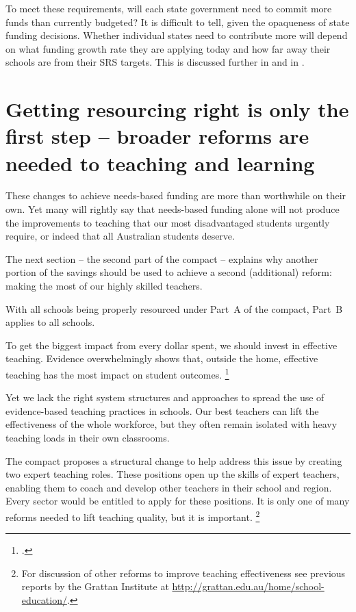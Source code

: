 \documentclass{grattan}
\begin{document}
To meet these requirements, will each state government need to commit more funds than currently budgeted?
It is difficult to tell, given the opaqueness of state funding decisions.
Whether individual states need to contribute more will depend on what funding growth rate they are applying today and how far away their schools are from their SRS targets.
This is discussed further in  and in .

\section{Getting resourcing right is only the first step -- broader reforms are needed to teaching and learning}\label{sec:getting-resourcing-right-is-only-the-first-step-broader-reforms-are-needed-to-teaching-and-learning}

These changes to achieve needs-based funding are more than worthwhile on their own.
Yet many will rightly say that needs-based funding alone will not produce the improvements to teaching that our most disadvantaged students urgently require, or indeed that all Australian students deserve.

The next section -- the second part of the compact -- explains why another portion of the savings should be used to achieve a second (additional) reform: making the most of our highly skilled teachers.

With all schools being properly resourced under Part~A of the compact, Part~B applies to all schools.

\label{chap:part-b-investing-more-in-highly-skilled-teachers}

To get the biggest impact from every dollar spent, we should invest in effective teaching. Evidence overwhelmingly shows that, outside the home, effective teaching has the most impact on student outcomes.%
\footcites{Hattie2008visiblelearningsynthesis}{McKenzie2005Teachersmatterattracting}{OECD2009CreatingEffectiveTeaching}

Yet we lack the right system structures and approaches to spread the use of evidence-based teaching practices in schools.
Our best teachers can lift the effectiveness of the whole workforce, but they often remain isolated with heavy teaching loads in their own classrooms.

The compact proposes a structural change to help address this issue by creating two expert teaching roles. These positions open up the skills of expert teachers, enabling them to coach and develop other teachers in their school and region. Every sector would be entitled to apply for these positions. It is only one of many reforms needed to lift teaching quality, but it is important.%
\footnote{For discussion of other reforms to improve teaching effectiveness see previous reports by the Grattan Institute at \textcolor{blue}{\url{http://grattan.edu.au/home/school-education/}}.}
\end{document}

